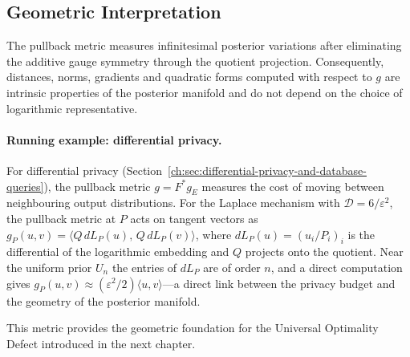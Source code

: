 \subsection{Geometric Interpretation}\label{ch:sec:geometric-interpretation}
The pullback metric measures infinitesimal posterior variations after eliminating the additive gauge symmetry through the quotient projection.
Consequently, distances, norms, gradients and quadratic forms computed with respect to \(g\) are intrinsic properties of the posterior manifold and do not depend on the choice of logarithmic representative.
\paragraph{Running example: differential privacy.}
For differential privacy (Section~\ref{ch:sec:differential-privacy-and-database-queries}), the pullback metric $g=F^*g_E$ measures the cost of moving between neighbouring output distributions.  For the Laplace mechanism with $\mathcal D=6/\varepsilon^2$, the pullback metric at $P$ acts on tangent vectors as $g_P(u,v)=\langle Q\,dL_P(u),\,Q\,dL_P(v)\rangle$, where $dL_P(u)=(u_i/P_i)_i$ is the differential of the logarithmic embedding and $Q$ projects onto the quotient.  Near the uniform prior $U_n$ the entries of $dL_P$ are of order $n$, and a direct computation gives $g_P(u,v)\approx (\varepsilon^2/2)\langle u,v\rangle$---a direct link between the privacy budget and the geometry of the posterior manifold.

This metric provides the geometric foundation for the Universal Optimality Defect introduced in the next chapter.
